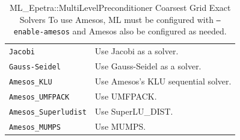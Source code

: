 \begin{table}
\begin{center}
\begin{tabular}{ | p{5cm} | p{10cm} | }
\hline
\verb!Jacobi! & Use Jacobi as a solver. \\
\verb!Gauss-Seidel! & Use Gauss-Seidel as a solver. \\
\verb!Amesos_KLU! & Use Amesos's KLU sequential solver. \\
\verb!Amesos_UMFPACK! & Use UMFPACK. \\
\verb!Amesos_Superludist! & Use SuperLU\_DIST. \\
\verb!Amesos_MUMPS! & Use MUMPS. \\
\hline
\end{tabular}
\caption{ML\_Epetra::MultiLevelPreconditioner Coarsest Grid Exact Solvers
  To use Amesos, ML must be configured with {\tt --enable-amesos} 
  and Amesos also be configured as needed.}
\label{tab:ml:coarse}
\end{center}
\end{table}

